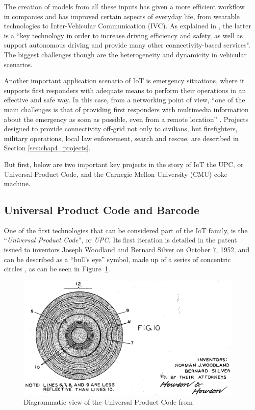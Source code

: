 		The creation of models from all these inputs has given a more efficient workflow in companies and has improved certain aspects of everyday life, from wearable 	technologies to Inter-Vehicular Communication (IVC).
		As explained in \cite{BUJARI2020101204}, the latter is a ``key technology in order to increase driving efficiency and safety, as well as	support autonomous driving and provide many other connectivity-based services''.
		The biggest challenges though are the heterogeneity and dynamicity in vehicular scenarios.
		
		Another important application scenario of IoT is emergency situations, where it supports first responders with adequate means to perform their operations in an effective and safe way.
		In this case, from a networking point of view, ``one of the main challenges is that of providing first responders with multimedia information about the emergency as soon as possible, even from a remote location'' \cite{4197976}.
		Projects designed to provide connectivity off-grid not only to civilians, but firefighters, military operations, local law enforcement, search and rescue, are described in Section \ref{sec:chap4_projects}.

		But first, below are two important key projects in the story of IoT the UPC, or Universal Product Code, and the Carnegie Mellon University (CMU) coke machine.
		
		\subsection{Universal Product Code and Barcode}
	
			One of the first technologies that can be considered part of the IoT family, is the ``\textit{Universal Product Code}'', or \textit{UPC}.
			Its first iteration is detailed in the patent issued to inventors Joseph Woodland and Bernard Silver on October 7, 1952, and can be described as a ``bull's eye'' symbol, made up of a series of concentric circles \cite{upc_patent}, as can be seen in Figure~\ref{fig:upc_patent}.
			
			\begin{figure}[h]
				\centering
				\includegraphics[width=\textwidth-4cm]{resources/img/chap2/upc_1}
				\caption[Diagrammatic view of the Universal Product Code]{Diagrammatic view of the Universal Product Code from \cite{upc_patent}}
				\label{fig:upc_patent}
			\end{figure}
			

